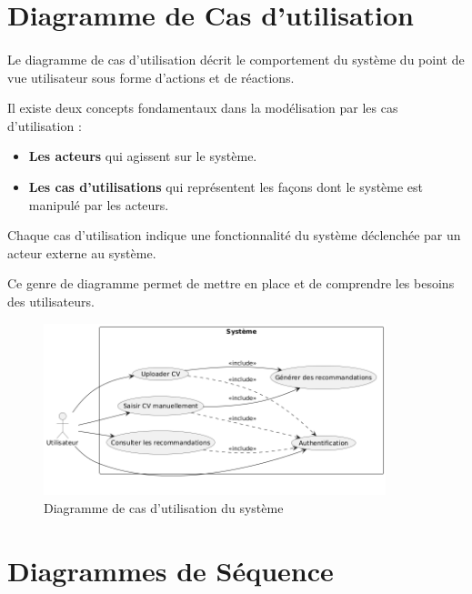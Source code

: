 \section{Diagramme de Cas d’utilisation}
\paragraph{}\begin{spacing}{1}
Le diagramme de cas d’utilisation décrit le comportement du système du point de vue utilisateur sous forme d’actions et de réactions.

Il existe deux concepts fondamentaux dans la modélisation par les cas d’utilisation :
\begin{itemize}
    \item \textbf{Les acteurs} qui agissent sur le système.
    \item \textbf{Les cas d’utilisations} qui représentent les façons dont le système est manipulé par les acteurs.
\end{itemize}

Chaque cas d’utilisation indique une fonctionnalité du système déclenchée par un acteur externe au système.

Ce genre de diagramme permet de mettre en place et de comprendre les besoins des utilisateurs.
\end{spacing}
\begin{figure}
    \centering
    \includegraphics[width=\linewidth, height=5cm]{images/diagramme cas utilisation.png}
    \caption{Diagramme de cas d'utilisation du système} 
\end{figure}

\section{Diagrammes de Séquence}
